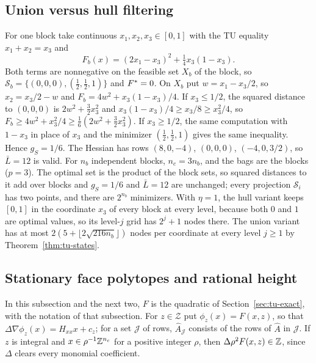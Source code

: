 \subsection{Union versus hull filtering}\label{app:tu-union}

\begin{example}\label{ex:tu-union}
For one block take continuous $x_1,x_2,x_3\in[0,1]$ with the TU equality
$x_1+x_2=x_3$ and
\[
F_b(x)=(2x_1-x_3)^2+\tfrac14x_3(1-x_3).
\]
Both terms are nonnegative on the feasible set $X_b$ of the block, so
$\mathcal S_b=\{(0,0,0),(\tfrac12,\tfrac12,1)\}$ and $F^{*}=0$. On $X_b$ put
$w=x_1-x_3/2$, so $x_2=x_3/2-w$ and $F_b=4w^2+x_3(1-x_3)/4$. If $x_3\le1/2$,
the squared distance to $(0,0,0)$ is $2w^2+\frac32x_3^2$ and
$x_3(1-x_3)/4\ge x_3/8\ge x_3^2/4$, so
$F_b\ge4w^2+x_3^2/4\ge\frac16(2w^2+\frac32x_3^2)$. If $x_3\ge1/2$, the same
computation with $1-x_3$ in place of $x_3$ and the minimizer
$(\frac12,\frac12,1)$ gives the same inequality. Hence $g_S=1/6$. The Hessian
has rows $(8,0,-4)$, $(0,0,0)$, $(-4,0,3/2)$, so $\bar L=12$ is valid. For $n_b$
independent blocks, $n_c=3n_b$, and the bags are the blocks ($p=3$). The
optimal set is the product of the block sets, so squared distances to it add
over blocks and $g_S=1/6$ and $\bar L=12$ are unchanged; every projection
$\mathcal S_i$ has two points, and there are $2^{n_b}$ minimizers. With
$\eta=1$, the hull variant keeps $[0,1]$ in the coordinate $x_3$ of every
block at every level, because both $0$ and $1$ are optimal values, so its
level-$j$ grid has $2^j+1$ nodes there. The union variant has at most
$2(5+\lfloor2\sqrt{216n_b}\rfloor)$ nodes per coordinate at every level
$j\ge1$ by Theorem~\ref{thm:tu-states}.
\end{example}

\subsection{Stationary face polytopes and rational height}\label{app:tu-height}

In this subsection and the next two, $F$ is the quadratic of
Section~\ref{sec:tu-exact}, with the notation of that subsection. For
$z\in\mathcal Z$ put $\phi_z(x)=F(x,z)$, so that
$\Delta\nabla\phi_z(x)=\hat H_{xx}x+c_z$; for a set $\mathcal J$ of rows,
$\hat A_{\mathcal J}$ consists of the rows of $\hat A$ in $\mathcal J$. If $z$
is integral and $x\in\rho^{-1}\mathbb Z^{n_c}$ for a positive integer $\rho$, then
$\Delta\rho^2F(x,z)\in\mathbb Z$, since $\Delta$ clears every monomial coefficient.

